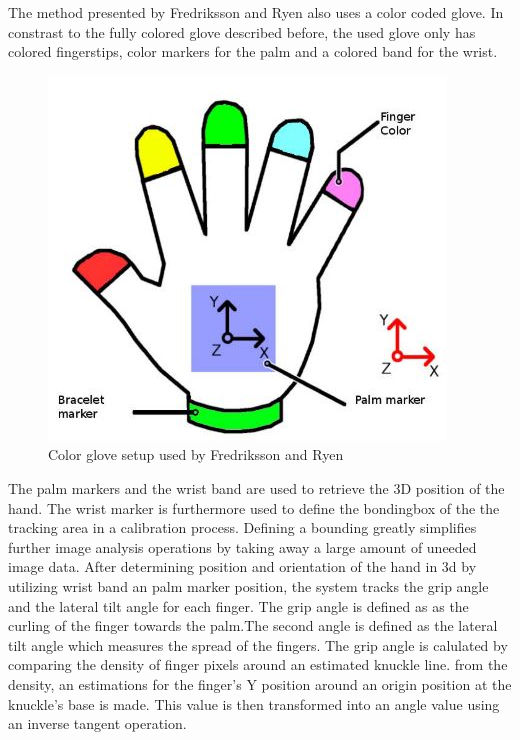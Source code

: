 The method presented by Fredriksson and Ryen \cite{Fredriksson.2008} also uses a color coded glove. In constrast to the fully colored glove described before, the used glove only has colored fingerstips, color markers for the palm and a colored band for the wrist.
\begin{figure}
\includegraphics[scale=0.61]{images/fredrikkson_color_glove.JPG}
\caption{Color glove setup used by Fredriksson and Ryen \cite{Fredriksson.2008} }
\label{wang color glove}
\end{figure}
The palm markers and the wrist band are used to retrieve the 3D position of the hand. The wrist marker is furthermore used to define the bondingbox of the the tracking area in a calibration process. Defining a bounding greatly simplifies further image analysis operations by taking away a large amount of uneeded image data.
After determining position and orientation of the hand in 3d by utilizing wrist band an palm marker position, the system tracks the grip angle and the lateral tilt angle for each finger. The grip angle is defined as as the curling of the finger towards the palm.The second angle is defined as the lateral tilt angle which measures the spread of the fingers.
The grip angle is calulated by comparing the density of finger pixels around an estimated knuckle line. from the density, an estimations for
the finger’s Y position around an origin position at the knuckle’s base is made. This value is then transformed into an angle value using an inverse tangent operation.

